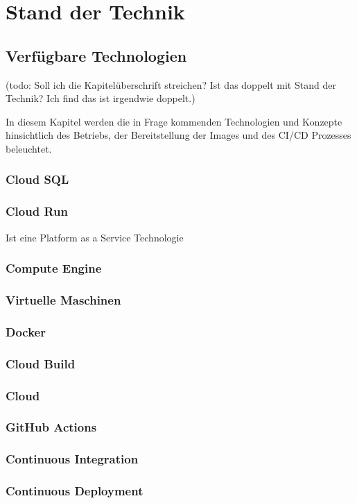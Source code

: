 \documentclass[pdftex,a4paper,abstracton,11pt,parskip=half,bibtotocnumbered]{scrartcl}
\begin{document}
\section{Stand der Technik}
	
	\subsection{Verfügbare Technologien} 
	(todo: Soll ich die Kapitelüberschrift streichen? Ist das doppelt mit Stand der Technik? Ich find das ist irgendwie doppelt.)

	In diesem Kapitel werden die in Frage kommenden Technologien und Konzepte hinsichtlich des Betriebs, der Bereitstellung der Images und des
	CI/CD Prozesses beleuchtet. 

		\subsubsection{Cloud SQL}
		\subsubsection{Cloud Run}
		Ist eine Platform as a Service Technologie
		\subsubsection{Compute Engine}
		\subsubsection{Virtuelle Maschinen}
		\subsubsection{Docker}
		\subsubsection{Cloud Build}
		\subsubsection{Cloud }
		\subsubsection{GitHub Actions}
		\subsubsection{Continuous Integration}
		\subsubsection{Continuous Deployment}
\end{document}
